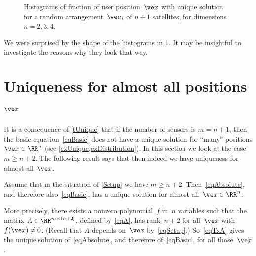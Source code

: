 \documentclass[reqno]{amsart}
\begin{document}
\begin{ex}
\begin{figure}[htbp]
\caption{Histograms of fraction of user position~$\ve x$ with unique solution for a random arrangement~$\ve a_i$ of $n+1$ satellites, for dimensions~$n = 2,3,4$.}
\label{fDistribution}
\end{figure}

We were surprised by the shape of the histograms in \cref{fDistribution}. It may be insightful to investigate the reasons why they look that way.
\end{ex}

\section{Uniqueness for almost all positions $\ve x$}
\label{sAlmost}

It is a consequence of \cref{tUnique} that if the number of sensors is
$m = n + 1$, then the basic equation~\eqref{eqBasic} does not have a
unique solution for ``many'' positions $\ve x \in \RR^n$ (see \cref{exUnique,exDistribution}).
In this section we look at the case $m \ge n +
2$. The following result says that then indeed we have uniqueness for
almost all~$\ve x$.

\begin{theorem} \label{tM5}%
  Assume that in the situation of \cref{Setup} we have $m \ge n +
  2$. Then~\eqref{eqAbsolute}, and therefore also~\eqref{eqBasic}, has
  a unique solution for almost all~$\ve x \in \RR^n$.

  More precisely, there exists a nonzero polynomial~$f$ in~$n$
  variables such that the matrix $A \in \RR^{m \times (n + 2)}$,
  defined by~\eqref{eqA}, has rank~$n + 2$ for all~$\ve x$ with
  $f(\ve x) \ne 0$. (Recall that $A$ depends on~$\ve x$
  by~\eqref{eqSetup}.) So~\eqref{eqTxA} gives the unique solution
  of~\eqref{eqAbsolute}, and therefore of~\eqref{eqBasic}, for all
  those~$\ve x$.
\end{theorem}
\end{document}
